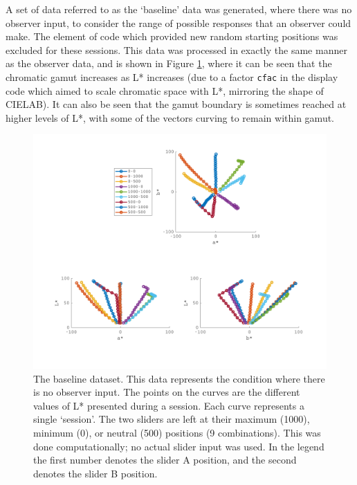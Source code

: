 A set of data referred to as the `baseline' data was generated, where there was no observer input, to consider the range of possible responses that an observer could make. The element of code which provided new random starting positions was excluded for these sessions. This data was processed in exactly the same manner as the observer data, and is shown in Figure \ref{fig:overviewBL}, where it can be seen that the chromatic gamut increases as L* increases (due to a factor \texttt{cfac} in the display code which aimed to scale chromatic space with L*, mirroring the shape of CIELAB). It can also be seen that the gamut boundary is sometimes reached at higher levels of L*, with some of the vectors curving to remain within gamut.

\begin{figure}[htbp]
\includegraphics[max width=1.2\textwidth, center]{figs/LargeSphere/baselinedataOverview.pdf}
\caption{The baseline dataset. This data represents the condition where there is no observer input. The points on the curves are the different values of L* presented during a session. Each curve represents a single `session'. The two sliders are left at their maximum (1000), minimum (0), or neutral (500) positions (9 combinations). This was done computationally; no actual slider input was used. In the legend the first number denotes the slider A position, and the second denotes the slider B position.}
\label{fig:overviewBL}
\end{figure}


